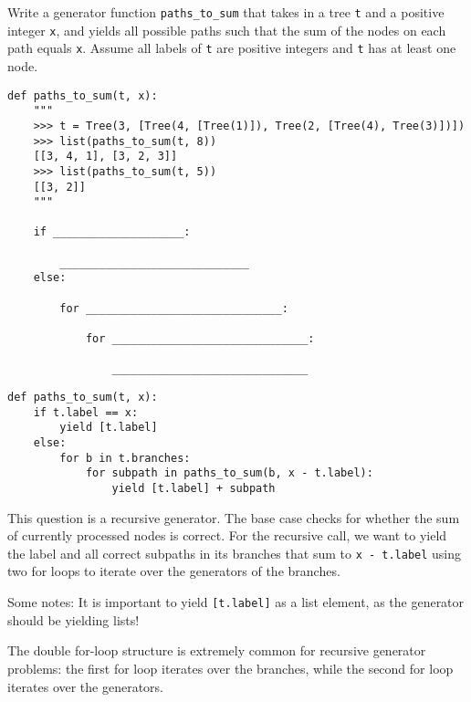 \question
Write a generator function \lstinline{paths_to_sum} that takes in a tree \lstinline{t} and a positive integer \lstinline{x}, and yields all possible paths such that the sum of the nodes on each path equals \lstinline{x}. Assume all labels of \lstinline{t} are positive integers and \lstinline{t} has at least one node.

\begin{lstlisting}
def paths_to_sum(t, x):
    """
    >>> t = Tree(3, [Tree(4, [Tree(1)]), Tree(2, [Tree(4), Tree(3)])])
    >>> list(paths_to_sum(t, 8))
    [[3, 4, 1], [3, 2, 3]]
    >>> list(paths_to_sum(t, 5))
    [[3, 2]]
    """

    if ____________________:

        _____________________________
    else:

        for ______________________________:

            for ______________________________:

                ______________________________
\end{lstlisting}

\begin{solution}
\begin{lstlisting}
def paths_to_sum(t, x):
    if t.label == x:
        yield [t.label]
    else:
        for b in t.branches:
            for subpath in paths_to_sum(b, x - t.label):
                yield [t.label] + subpath
\end{lstlisting}

This question is a recursive generator. The base case checks for whether the sum of currently processed nodes is correct. For the recursive call, we want to yield the label and all correct subpaths in its branches that sum to \lstinline{x - t.label} using two for loops to iterate over the generators of the branches.

Some notes:
It is important to yield \lstinline{[t.label]} as a list element, as the generator should be yielding lists!

The double for-loop structure is extremely common for recursive generator problems: the first for loop iterates over the branches, while the second for loop iterates over the generators.

\end{solution}